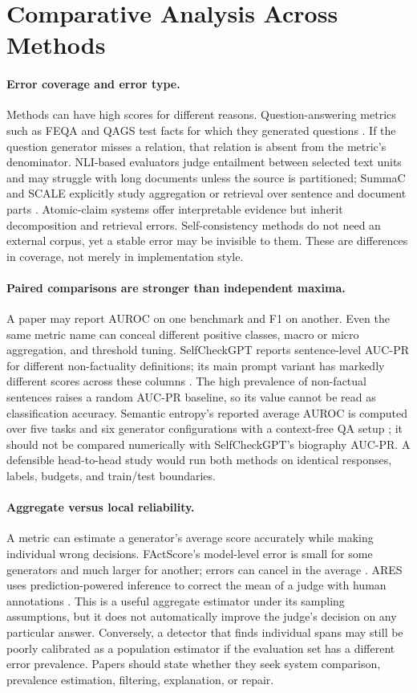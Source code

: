 \documentclass[11pt]{article}
\begin{document}
\section{Comparative Analysis Across Methods}
\paragraph{Error coverage and error type.} Methods can have high scores for different reasons. Question-answering metrics such as FEQA and QAGS test facts for which they generated questions \citep{I042,I062}. If the question generator misses a relation, that relation is absent from the metric's denominator. NLI-based evaluators judge entailment between selected text units and may struggle with long documents unless the source is partitioned; SummaC and SCALE explicitly study aggregation or retrieval over sentence and document parts \citep{I092,I074}. Atomic-claim systems offer interpretable evidence but inherit decomposition and retrieval errors. Self-consistency methods do not need an external corpus, yet a stable error may be invisible to them. These are differences in coverage, not merely in implementation style.

\paragraph{Paired comparisons are stronger than independent maxima.} A paper may report AUROC on one benchmark and F1 on another. Even the same metric name can conceal different positive classes, macro or micro aggregation, and threshold tuning. SelfCheckGPT reports sentence-level AUC-PR for different non-factuality definitions; its main prompt variant has markedly different scores across these columns \citep{C08}. The high prevalence of non-factual sentences raises a random AUC-PR baseline, so its value cannot be read as classification accuracy. Semantic entropy's reported average AUROC is computed over five tasks and six generator configurations with a context-free QA setup \citep{C10}; it should not be compared numerically with SelfCheckGPT's biography AUC-PR. A defensible head-to-head study would run both methods on identical responses, labels, budgets, and train/test boundaries.

\paragraph{Aggregate versus local reliability.} A metric can estimate a generator's average score accurately while making individual wrong decisions. FActScore's model-level error is small for some generators and much larger for another; errors can cancel in the average \citep{C07}. ARES uses prediction-powered inference to correct the mean of a judge with human annotations \citep{I044}. This is a useful aggregate estimator under its sampling assumptions, but it does not automatically improve the judge's decision on any particular answer. Conversely, a detector that finds individual spans may still be poorly calibrated as a population estimator if the evaluation set has a different error prevalence. Papers should state whether they seek system comparison, prevalence estimation, filtering, explanation, or repair.
\end{document}
